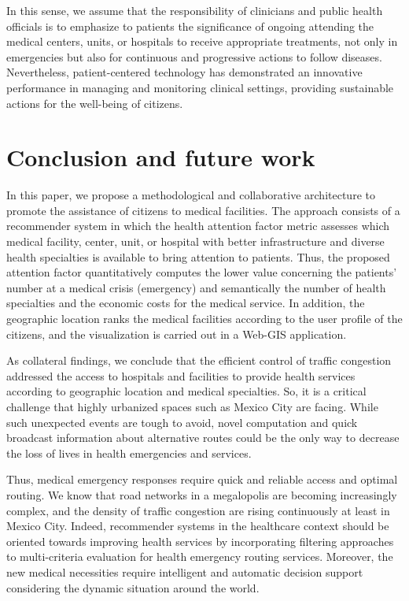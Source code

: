 \documentclass[sustainability,article,submit,pdftex,moreauthors]{Definitions/mdpi}
\begin{document}
{In this sense, we assume that the responsibility of clinicians and public health officials is to emphasize to patients the significance of ongoing attending the medical centers, units, or hospitals to receive appropriate treatments, not only in emergencies but also for continuous and progressive actions to follow diseases. Nevertheless, patient-centered technology has demonstrated an innovative performance in managing and monitoring clinical settings, providing sustainable actions for the well-being of citizens}.

\section{Conclusion and future work}
In this paper, we propose a methodological and collaborative architecture to promote the assistance of citizens to medical facilities. The approach consists of a recommender system in which the health attention factor metric assesses which medical facility, center, unit, or hospital with better infrastructure and diverse health specialties is available to bring attention to patients. Thus, the proposed attention factor quantitatively computes the lower value concerning the patients' number at a medical crisis (emergency) and semantically the number of health specialties and the economic costs for the medical service. In addition, the geographic location ranks the medical facilities according to the user profile of the citizens, and the visualization is carried out in a Web-GIS application.

As collateral findings, we conclude that the efficient control of traffic congestion addressed the access to hospitals and facilities to provide health services according to geographic location and medical specialties. So, it is a critical challenge that highly urbanized spaces such as Mexico City are facing. While such unexpected events are tough to avoid, novel computation and quick broadcast information about alternative routes could be the only way to decrease the loss of lives in health emergencies and services. 

Thus, medical emergency responses require quick and reliable access and optimal routing. We know that road networks in a megalopolis are becoming increasingly complex, and the density of traffic congestion are rising continuously at least in Mexico City. Indeed, recommender systems in the healthcare context should be oriented towards improving health services by incorporating filtering approaches to multi-criteria evaluation for health emergency routing services. Moreover, the new medical necessities require intelligent and automatic decision support considering the dynamic situation around the world.
\end{document}
